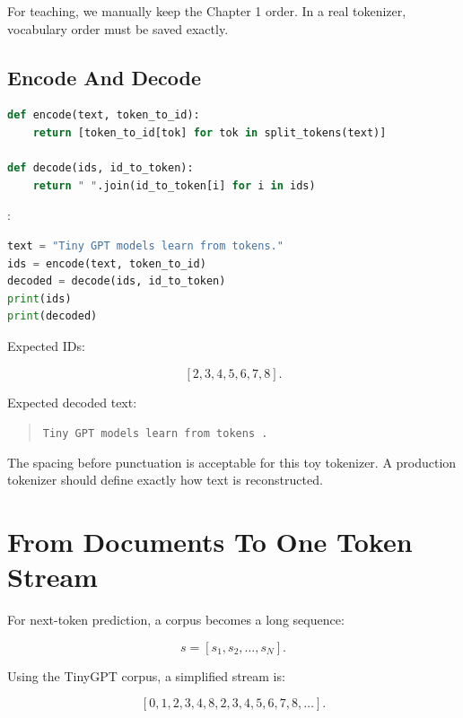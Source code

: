 For teaching, we manually keep the Chapter 1 order. In a real tokenizer, vocabulary order must be saved exactly.

\subsection{Encode And Decode}

\begin{lstlisting}[language=Python]
def encode(text, token_to_id):
    return [token_to_id[tok] for tok in split_tokens(text)]

def decode(ids, id_to_token):
    return " ".join(id_to_token[i] for i in ids)
\end{lstlisting}

:

\begin{lstlisting}[language=Python]
text = "Tiny GPT models learn from tokens."
ids = encode(text, token_to_id)
decoded = decode(ids, id_to_token)
print(ids)
print(decoded)
\end{lstlisting}

Expected IDs:

\[
[2,3,4,5,6,7,8].
\]

Expected decoded text:

\begin{quote}
\texttt{Tiny GPT models learn from tokens .}
\end{quote}

The spacing before punctuation is acceptable for this toy tokenizer. A production tokenizer should define exactly how text is reconstructed.

\section{From Documents To One Token Stream}

For next-token prediction, a corpus becomes a long sequence:

\[
s=[s_1,s_2,\ldots,s_N].
\]

Using the TinyGPT corpus, a simplified stream is:

\[
[0,1,2,3,4,8,2,3,4,5,6,7,8,\ldots].
\]

\begin{center}
\end{center}

